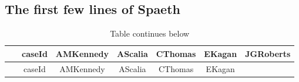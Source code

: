 \documentclass[12pt,twoside]{article}
\begin{document}
\subsection{The first few lines of
Spaeth}\label{the-first-few-lines-of-spaeth}

\tiny

\begin{longtable}[c]{@{}ccccccc@{}}
\caption{Table continues below}\tabularnewline
\toprule
\begin{minipage}[b]{0.10\columnwidth}\centering\strut
~
\strut\end{minipage} &
\begin{minipage}[b]{0.10\columnwidth}\centering\strut
caseId
\strut\end{minipage} &
\begin{minipage}[b]{0.13\columnwidth}\centering\strut
AMKennedy
\strut\end{minipage} &
\begin{minipage}[b]{0.11\columnwidth}\centering\strut
AScalia
\strut\end{minipage} &
\begin{minipage}[b]{0.11\columnwidth}\centering\strut
CThomas
\strut\end{minipage} &
\begin{minipage}[b]{0.10\columnwidth}\centering\strut
EKagan
\strut\end{minipage} &
\begin{minipage}[b]{0.12\columnwidth}\centering\strut
JGRoberts
\strut\end{minipage}\tabularnewline
\midrule
\endfirsthead
\toprule
\begin{minipage}[b]{0.10\columnwidth}\centering\strut
~
\strut\end{minipage} &
\begin{minipage}[b]{0.10\columnwidth}\centering\strut
caseId
\strut\end{minipage} &
\begin{minipage}[b]{0.13\columnwidth}\centering\strut
AMKennedy
\strut\end{minipage} &
\begin{minipage}[b]{0.11\columnwidth}\centering\strut
AScalia
\strut\end{minipage} &
\begin{minipage}[b]{0.11\columnwidth}\centering\strut
CThomas
\strut\end{minipage} &
\begin{minipage}[b]{0.10\columnwidth}\centering\strut
EKagan
\strut\end{minipage} &

\end{longtable}
\end{document}
